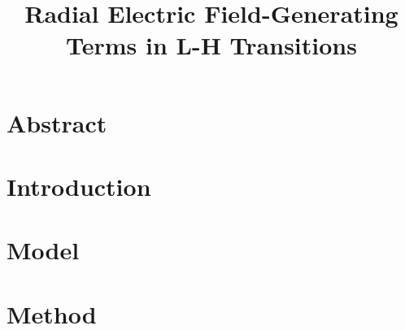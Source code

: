 \documentclass[a4paper,12pt]{report}
\title{Radial Electric Field-Generating Terms in L-H Transitions}
\author{\me}
\begin{document}



\normalsize

\chapter*{Abstract}\label{chapter:abstract}
%

\tableofcontents


\chapter{Introduction}\label{chapter:introduction}
\setcounter{page}{0}



\clearemptydoublepage

\chapter{Model}\label{chapter:model}



\clearemptydoublepage

\chapter{Method}\label{chapter:method}


\clearemptydoublepage


\appendix
{}


\printbibliography
\end{document}

